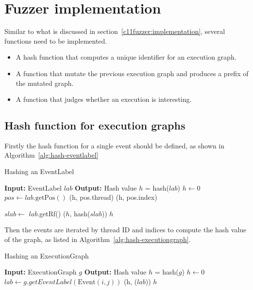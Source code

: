 \section{Fuzzer implementation}

Similar to what is discussed in section~\ref{c11fuzzer:implementation}, several functions need to be implemented.

\begin{itemize}
	\item A hash function that computes a unique identifier for an execution graph.
	\item A function that mutate the previous execution graph and produces a prefix of the mutated graph.
	\item A function that judges whether an execution is interesting.
\end{itemize}


\subsection{Hash function for execution graphs}\label{sec:hashf}
Firstly the hash function for a single event should be defined, as shown in Algorithm~\ref{alg:hash-eventlabel}

\begin{algorithm}
	\caption{Hashing an EventLabel}
	\label{alg:hash-eventlabel}
	\begin{algorithmic}[1]
		\STATE \textbf{Input:} EventLabel $lab$
		\STATE \textbf{Output:} Hash value $h$ = hash($lab$)
		\STATE $h \leftarrow 0$
		\STATE $pos \leftarrow lab.\text{getPos}()$
		\STATE {}(h, pos.thread)
		\STATE {}(h, pos.index)

		\STATE $slab \leftarrow$ $lab$.getRf()
		\STATE {}($h$, hash($slab$))
		\ENDIF
		\ENDIF
		\RETURN $h$
	\end{algorithmic}
\end{algorithm}

Then the events are iterated by thread ID and indices to compute the hash value of the graph, as listed in Algorithm~\ref{alg:hash-executiongraph}.


\begin{algorithm}
	\caption{Hashing an ExecutionGraph}
	\label{alg:hash-executiongraph}
	\begin{algorithmic}[1]
		\STATE \textbf{Input:} ExecutionGraph $g$
		\STATE \textbf{Output:} Hash value $h$ = hash($g$)
		\STATE $h \leftarrow 0$
		\STATE $lab \leftarrow g.getEventLabel(\text{Event}(i, j))$
		\STATE {}(h, ($lab$))
		\ENDFOR
		\ENDFOR
		\RETURN $h$
	\end{algorithmic}
\end{algorithm}

